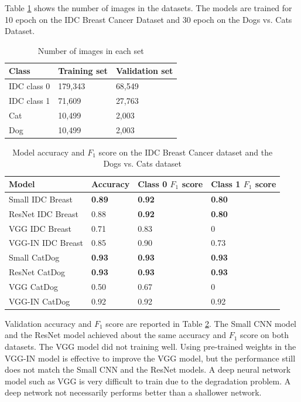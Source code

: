 Table \ref{stats} shows the number of images in the datasets. The models are trained for 10 epoch on the IDC Breast Cancer Dataset and 30 epoch on the Dogs vs. Cats Dataset.
\begin{table}[h]
\centering
\begin{tabular}{ |p{3cm}||p{3cm}|p{3cm}|  }
 \hline
 Class       & Training set & Validation set\\
 \hline
 \hline
 IDC class 0   & 179,343   &  68,549 \\
 IDC class 1  & 71,609  & 27,763\\
 \hline
 Cat   & 10,499  &  2,003\\
 Dog  & 10,499  &  2,003\\
 \hline
\end{tabular}
\caption{Number of images in each set}
\label{stats}
\end{table}


\begin{table}[h]
\centering
\begin{tabular}{ |p{4cm}||p{3cm}|p{3cm}|p{3cm}|  }
 \hline
 Model       & Accuracy & Class 0 $F_1$ score & Class 1 $F_1$ score\\
 \hline
 \hline
 Small IDC Breast   & \textbf{0.89}  & \textbf{0.92} &  \textbf{0.80}\\
 ResNet IDC Breast  & 0.88  & \textbf{0.92} &  \textbf{0.80}\\
 VGG IDC Breast      & 0.71  & 0.83 &  0\\
 VGG-IN IDC Breast & 0.85 & 0.90 & 0.73 \\
 \hline
 Small CatDog   & \textbf{0.93}  & \textbf{0.93} &  \textbf{0.93}\\
 ResNet CatDog  & \textbf{0.93}  & \textbf{0.93} &  \textbf{0.93}\\
 VGG CatDog      & 0.50  & 0.67 &  0\\
 VGG-IN CatDog  & 0.92 & 0.92 & 0.92 \\
  \hline
\end{tabular}
\caption{Model accuracy and $F_1$ score on the IDC Breast Cancer dataset and the Dogs vs. Cats dataset}
\label{acctable2}
\end{table}

Validation accuracy and $F_1$ score are reported in Table \ref{acctable2}. The Small CNN model and the ResNet model achieved about the same accuracy and $F_1$ score on both datasets. The VGG model did not training well. Using pre-trained weights in the VGG-IN model is effective to improve the VGG model, but the performance still does not match the Small CNN and the ResNet models. A deep neural network model such as VGG is very difficult to train due to the degradation problem. A deep network not necessarily performs better than a shallower network.

